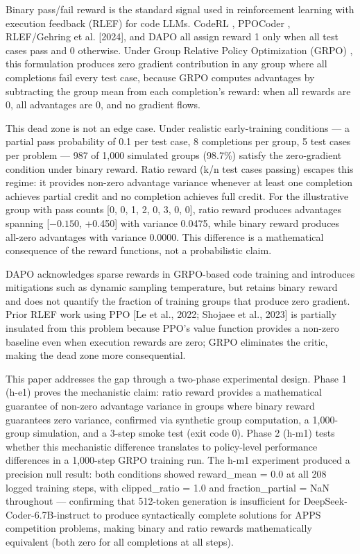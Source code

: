 
Binary pass/fail reward is the standard signal used in reinforcement learning with execution feedback (RLEF) for code LLMs. CodeRL \citep{Le2022CodeRL}, PPOCoder \citep{Shojaee2023PPOCoder}, RLEF/Gehring et al. [2024], and DAPO \citep{Yu2025DAPO} all assign reward 1 only when all test cases pass and 0 otherwise. Under Group Relative Policy Optimization (GRPO) \citep{Shao2024DeepSeekMath}, this formulation produces zero gradient contribution in any group where all completions fail every test case, because GRPO computes advantages by subtracting the group mean from each completion's reward: when all rewards are 0, all advantages are 0, and no gradient flows.

This dead zone is not an edge case. Under realistic early-training conditions --- a partial pass probability of 0.1 per test case, 8 completions per group, 5 test cases per problem --- 987 of 1,000 simulated groups (98.7\%) satisfy the zero-gradient condition under binary reward. Ratio reward (k/n test cases passing) escapes this regime: it provides non-zero advantage variance whenever at least one completion achieves partial credit and no completion achieves full credit. For the illustrative group with pass counts [0, 0, 1, 2, 0, 3, 0, 0], ratio reward produces advantages spanning [$-0.150$, +0.450] with variance 0.0475, while binary reward produces all-zero advantages with variance 0.0000. This difference is a mathematical consequence of the reward functions, not a probabilistic claim.

DAPO \citep{Yu2025DAPO} acknowledges sparse rewards in GRPO-based code training and introduces mitigations such as dynamic sampling temperature, but retains binary reward and does not quantify the fraction of training groups that produce zero gradient. Prior RLEF work using PPO [Le et al., 2022; Shojaee et al., 2023] is partially insulated from this problem because PPO's value function provides a non-zero baseline even when execution rewards are zero; GRPO eliminates the critic, making the dead zone more consequential.

This paper addresses the gap through a two-phase experimental design. Phase 1 (h-e1) proves the mechanistic claim: ratio reward provides a mathematical guarantee of non-zero advantage variance in groups where binary reward guarantees zero variance, confirmed via synthetic group computation, a 1,000-group simulation, and a 3-step smoke test (exit code 0). Phase 2 (h-m1) tests whether this mechanistic difference translates to policy-level performance differences in a 1,000-step GRPO training run. The h-m1 experiment produced a precision null result: both conditions showed reward\_mean = 0.0 at all 208 logged training steps, with clipped\_ratio = 1.0 and fraction\_partial = NaN throughout --- confirming that 512-token generation is insufficient for DeepSeek-Coder-6.7B-instruct to produce syntactically complete solutions for APPS competition problems, making binary and ratio rewards mathematically equivalent (both zero for all completions at all steps).

